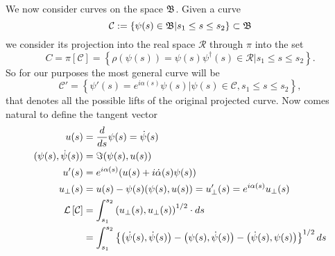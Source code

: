 We now consider curves on the space $ \mathfrak{B} $. Given a curve 
\begin{equation}
\mathcal{C}:=\left\{\psi(s)\in\mathfrak{B} |s_1\leq s\leq s_2 \right\}\subset \mathfrak{B}
\end{equation}
we consider its projection into the real space $ \mathcal{R} $ through $ \pi $ into the set 
\begin{equation}
C=\pi\left[\mathcal{C}\right]=\left\{\rho(\psi(s))=\psi(s)\psi^{\dagger}(s)\in\mathcal{R}|s_1\leq s\leq s_2 \right\}.
\end{equation}
So for our purposes the most general curve will be 
\begin{equation}
\mathcal{C}'=\left\{\psi'(s)=e^{i\alpha(s)}\psi(s)|\psi(s)\in\mathcal{C}, s_1\leq s\leq s_2 \right\},
\end{equation}
that denotes all the possible lifts of the original projected curve. Now comes natural to define the tangent vector 
\begin{align}
	u(s)&=\dfrac{d}{ds}\psi(s)=\dot{\psi}(s)\\
	(\psi(s),\dot{\psi}(s))&=\Im(\psi(s),u(s))\label{eq:3.12}\\
	u'(s)&=e^{i\alpha(s)}(u(s)+i\dot{\alpha}(s)\psi(s))\\
	u_{\perp}(s)&=u(s)-\psi(s)(\psi(s),u(s))=u_{\perp}'(s)=e^{i\alpha(s)}u_{\perp}(s)\\
	\mathcal{L}\left[\mathcal{C}\right]&=\int_{s_1}^{s_2}\left(u_{\perp}(s),u_{\perp}(s)\right)^{1/2}\cdot\mathop{}\!d s \\
	&=\int_{s_1}^{s_2}\left\{\left(\dot{\psi}(s),\dot{\psi}(s)\right)-\left(\psi(s),\dot{\psi}(s)\right)-\left(\dot{\psi}(s),\psi(s)\right) \right\}^{1/2} \mathop{}\!d s
\end{align}

